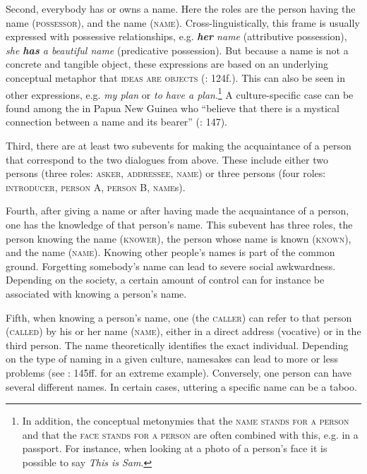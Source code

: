 \documentclass[output=paper,colorlinks,citecolor=brown]{langscibook}
\begin{document}
Second, everybody has or owns a name. Here the roles are the person having the name (\textsc{possessor}), and the name (\textsc{name}). Cross-linguistically, this frame is usually expressed with possessive relationships, e.g. \textit{\textbf{her} name} (attributive possession), \textit{she \textbf{has} a beautiful name} (predicative possession). But because a name is not a concrete and tangible object, these expressions are based on an underlying conceptual metaphor that \textsc{ideas are objects} (\citealt{Lakoff1999}: 124f.). This can also be seen in other expressions, e.g. \textit{my plan} or \textit{to have a plan}.\footnote{In addition, the conceptual metonymies that the \textsc{name stands for a person} and that the \textsc{face stands for a person} are often combined with this, e.g. in a passport. For instance, when looking at a photo of a person’s face it is possible to say \textit{This is Sam}.} A culture-specific case can be found among the  in Papua New Guinea who “believe that there is a mystical connection between a name and its bearer” (\citealt{Moutu2013}: 147).

Third, there are at least two subevents for making the acquaintance of a person that correspond to the two dialogues from  above. These include either two persons (three roles: \textsc{asker}, \textsc{addressee}, \textsc{name}) or three persons (four roles: \textsc{introducer}, \textsc{person} A, \textsc{person} B, \textsc{name}s).

Fourth, after giving a name or after having made the acquaintance of a person, one has the knowledge of that person’s name. This subevent has three roles, the person knowing the name (\textsc{knower}), the person whose name is known (\textsc{known}), and the name (\textsc{name}). Knowing other people’s names is part of the common ground. Forgetting somebody’s name can lead to severe social awkwardness. Depending on the society, a certain amount of control can for instance be associated with knowing a person’s name.

Fifth, when knowing a person’s name, one (the \textsc{caller}) can refer to that person (\textsc{called}) by his or her name (\textsc{name}), either in a direct address (vocative) or in the third person. The name theoretically identifies the exact individual. Depending on the type of naming in a given culture, namesakes can lead to more or less problems (see \citealt{Moutu2013}: 145ff. for an extreme example). Conversely, one person can have several different names. In certain cases, uttering a specific name can be a taboo.
\end{document}
